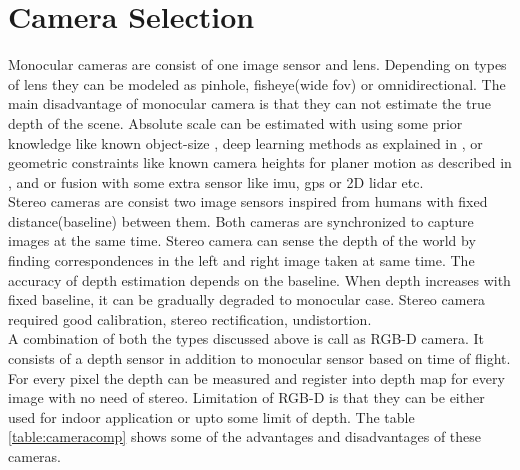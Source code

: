 \section{Camera Selection}
Monocular cameras are consist of one image sensor and lens. Depending on types of lens they can be modeled as pinhole, fisheye(wide \acrshort{fov}) or omnidirectional\cite{multiview_geometry}. The main disadvantage of monocular camera is that they can not estimate the true depth of the scene. Absolute scale can be estimated with using some prior knowledge like known object-size \cite{citymodel}, deep learning methods as explained in \cite{synthetic}, \cite{deepl}  or geometric constraints like known camera heights for planer motion as described in \cite{ground}, \cite{geometric} and \cite{planer} or fusion with some extra sensor like \acrshort{imu}, \acrshort{gps} or 2D \acrshort{lidar} etc. \\
\newline
Stereo cameras are consist two image sensors inspired from humans with fixed distance(baseline) between them. Both cameras are synchronized to capture images at the same time. Stereo camera can sense the depth of the world by finding correspondences in the left and right image taken at same time. The accuracy of depth estimation depends on the baseline. When depth increases with fixed baseline, it can be gradually degraded to monocular case. Stereo camera required good calibration, stereo rectification, undistortion. \\
\newline
A combination of both the types discussed above is call as RGB-D camera. It consists of a depth sensor in addition to monocular sensor based on time of flight. For every pixel the depth can be measured and register into depth map for every image with no need of stereo. Limitation of RGB-D is that they can be either used for indoor application or upto some limit of depth. The table \ref{table:cameracomp} shows some of the advantages and disadvantages of these cameras.\\
